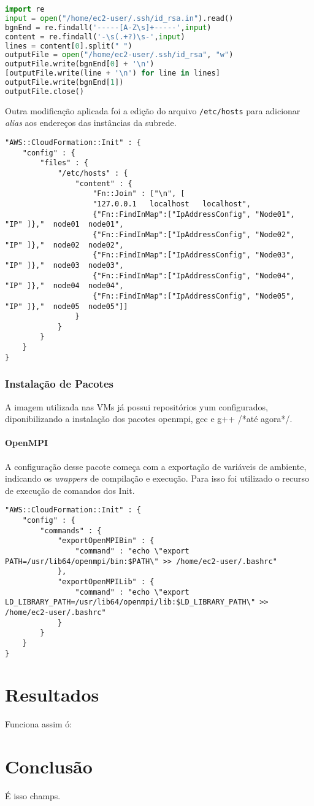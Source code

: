 \documentclass[tg]{mdtufsm}
\begin{document}
\begin{lstlisting}[language=Python]
import re
input = open("/home/ec2-user/.ssh/id_rsa.in").read()
bgnEnd = re.findall('-----[A-Z\s]+-----',input)
content = re.findall('-\s(.+?)\s-',input)
lines = content[0].split(" ")
outputFile = open("/home/ec2-user/.ssh/id_rsa", "w")
outputFile.write(bgnEnd[0] + '\n')
[outputFile.write(line + '\n') for line in lines]
outputFile.write(bgnEnd[1])
outputFile.close()
\end{lstlisting}

Outra modificação aplicada foi a edição do arquivo \verb|/etc/hosts| para adicionar \emph{alias} aos endereços das instâncias da subrede.

\begin{lstlisting}
"AWS::CloudFormation::Init" : {
	"config" : {
		"files" : {
			"/etc/hosts" : {
				"content" : {
					"Fn::Join" : ["\n", [
					"127.0.0.1   localhost   localhost",
					{"Fn::FindInMap":["IpAddressConfig", "Node01", "IP" ]},"  node01  node01",
					{"Fn::FindInMap":["IpAddressConfig", "Node02", "IP" ]},"  node02  node02",
					{"Fn::FindInMap":["IpAddressConfig", "Node03", "IP" ]},"  node03  node03",
					{"Fn::FindInMap":["IpAddressConfig", "Node04", "IP" ]},"  node04  node04",
					{"Fn::FindInMap":["IpAddressConfig", "Node05", "IP" ]},"  node05  node05"]]
				}
			}
		}
	}
}
\end{lstlisting}

\subsection{Instalação de Pacotes}

A imagem utilizada nas VMs já possui repositórios yum configurados, diponibilizando a instalação dos pacotes openmpi, gcc e g++ /*até agora*/.

\subsubsection{OpenMPI}

A configuração desse pacote começa com a exportação de variáveis de ambiente, indicando os \emph{wrappers} de compilação e execução. Para isso foi utilizado o recurso de execução de comandos dos Init.

\begin{lstlisting}
"AWS::CloudFormation::Init" : {
	"config" : {
		"commands" : {
			"exportOpenMPIBin" : {
				"command" : "echo \"export PATH=/usr/lib64/openmpi/bin:$PATH\" >> /home/ec2-user/.bashrc"
			},
			"exportOpenMPILib" : {
				"command" : "echo \"export LD_LIBRARY_PATH=/usr/lib64/openmpi/lib:$LD_LIBRARY_PATH\" >> /home/ec2-user/.bashrc"
			}
		}
	}
}
\end{lstlisting}



\chapter{Resultados}

Funciona assim ó:

\chapter{Conclusão}

É isso champs.


\setlength{\baselineskip}{\baselineskip}


\end{document}
